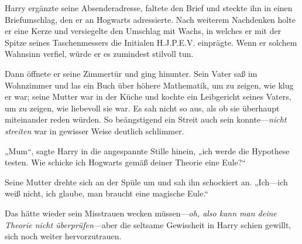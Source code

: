Harry ergänzte seine Absenderadresse, faltete den Brief und steckte ihn in einen Briefumschlag, den er an Hogwarts adressierte. Nach weiterem Nachdenken holte er eine Kerze und versiegelte den Umschlag mit Wachs, in welches er mit der Spitze seines Taschenmessers die Initialen H.J.P.E.V. einprägte. Wenn er solchem Wahnsinn verfiel, würde er es zumindest stilvoll tun.

Dann öffnete er seine Zimmertür und ging hinunter. Sein Vater saß im Wohnzimmer und las ein Buch über höhere Mathematik, um zu zeigen, wie klug er war; seine Mutter war in der Küche und kochte ein Leibgericht seines Vaters, um zu zeigen, wie liebevoll sie war. Es sah nicht so aus, als ob sie überhaupt miteinander reden würden. So beängstigend ein Streit auch sein konnte—\emph{nicht streiten} war in gewisser Weise deutlich schlimmer.

„Mum“, sagte Harry in die angespannte Stille hinein, „ich werde die Hypothese testen. Wie schicke ich Hogwarts gemäß deiner Theorie eine Eule?“

Seine Mutter drehte sich an der Spüle um und sah ihn schockiert an. „Ich—ich weiß nicht, ich glaube, man braucht eine magische Eule.“

Das hätte wieder sein Misstrauen wecken müssen—\emph{oh, also kann man deine Theorie nicht überprüfen}—aber die seltsame Gewissheit in Harry schien gewillt, sich noch weiter hervorzutrauen.

